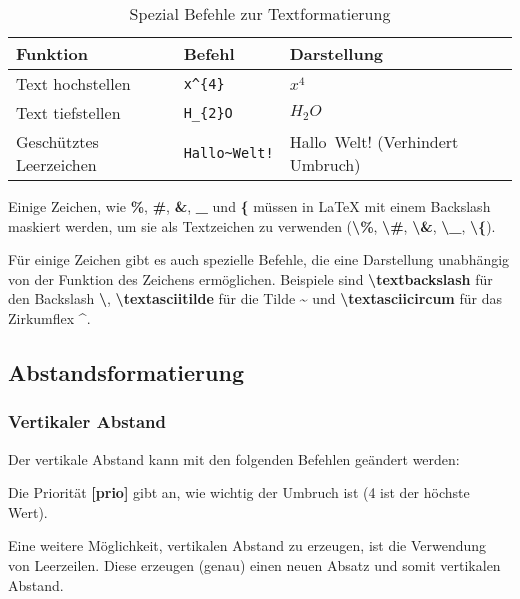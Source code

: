 \begin{table}[H]
    \centering
    \begin{tabular}{lll}
        \toprule
        \textbf{Funktion}       & \textbf{Befehl}                     & \textbf{Darstellung}             \\
        \midrule
        Text hochstellen        & \texttt{x\textasciicircum\{4\}}     & $x^{4}$                          \\
        Text tiefstellen        & \texttt{H\_\{2\}O}                  & $H_{2}O$                         \\
        Geschütztes Leerzeichen & \texttt{Hallo\textasciitilde Welt!} & Hallo~Welt! (Verhindert Umbruch) \\
        \bottomrule
    \end{tabular}
    \caption{Spezial Befehle zur Textformatierung}
    \label{tab:textformatierung}
\end{table}

Einige Zeichen, wie \textbf{\%}, \textbf{\#}, \textbf{\&}, \textbf{\_} und \textbf{\{} müssen in \LaTeX{} mit einem Backslash maskiert werden, um sie als Textzeichen zu verwenden (\textbf{\textbackslash\%}, \textbf{\textbackslash\#}, \textbf{\textbackslash\&}, \textbf{\textbackslash\_}, \textbf{\textbackslash\{}).

Für einige Zeichen gibt es auch spezielle Befehle, die eine Darstellung unabhängig von der Funktion des Zeichens ermöglichen. Beispiele sind \textbf{\textbackslash textbackslash} für den Backslash \textbf{\textbackslash}, \textbf{\textbackslash textasciitilde} für die Tilde \textbf{\textasciitilde} und \textbf{\textbackslash textasciicircum} für das Zirkumflex \textbf{\textasciicircum}.


\subsection{Abstandsformatierung}
\subsubsection{Vertikaler Abstand}
Der vertikale Abstand kann mit den folgenden Befehlen geändert werden:



Die Priorität \textbf{[prio]} gibt an, wie wichtig der Umbruch ist (4 ist der höchste Wert).

Eine weitere Möglichkeit, vertikalen Abstand zu erzeugen, ist die Verwendung von Leerzeilen. Diese erzeugen (genau) einen neuen Absatz und somit vertikalen Abstand.

